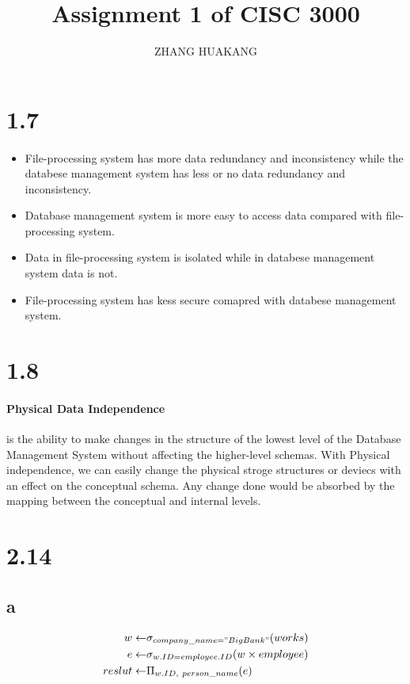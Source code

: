 \documentclass{article}
\title{Assignment 1 of CISC 3000}
\author{ZHANG HUAKANG}
\begin{document}
    \maketitle
    \section*{1.7}
    \paragraph{}
    \begin{itemize}
        \item File-processing system has more data redundancy and inconsistency while the databese management system has less or no data redundancy and inconsistency.
        \item Database management system is more easy to access data compared with file-processing system.
        \item Data in file-processing system is isolated while in databese management system data is not.
        \item File-processing system has kess secure comapred with databese management system.
    \end{itemize}
    \section*{1.8}
    \paragraph{Physical Data Independence}is the ability to make changes in the structure of the lowest level of the Database Management System without affecting the higher-level schemas. With Physical independence, we can easily change the physical stroge structures or deviecs with an effect on the conceptual schema. Any change done would be absorbed by the mapping between the conceptual and internal levels.
    \section*{2.14}
    \subsection*{a} 
    \begin{equation*}
        \begin{split}
            w\leftarrow&\sigma_{company\_name="BigBank"}(works)\\
            e\leftarrow&\sigma_{w.ID=employee.ID}(w\times employee)\\
            reslut\leftarrow&\Pi_{w.ID,\ person\_ name}(e)
        \end{split}
    \end{equation*}
\end{document}
